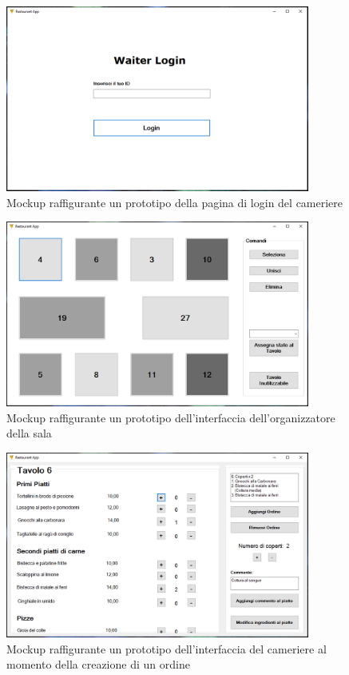 \documentclass{article}
\begin{document}
\newpage

\begin{figure}[!h]
\centering
\includegraphics[width= 10cm]{"Immagini/WaiterLogin.PNG"}
\caption{Mockup raffigurante un prototipo della pagina di login del cameriere}
\end{figure}

\begin{figure}[!h]
\centering
\includegraphics[width= 10cm]{"Immagini/HallOrganizatorPage.PNG"}
\caption{Mockup raffigurante un prototipo dell'interfaccia dell'organizzatore della sala}
\end{figure}

\newpage

\begin{figure}[!h]
\centering
\includegraphics[width= 10cm]{"Immagini/OrdineCameriere.PNG"}
\caption{Mockup raffigurante un prototipo dell'interfaccia del cameriere al momento della creazione di un ordine}
\end{figure}
\end{document}
